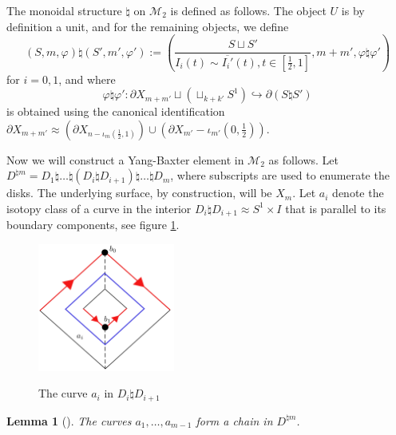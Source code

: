 \documentclass[reqno]{amsart}
\newtheorem{lemma}[theorem]{Lemma}
\theoremstyle{definition}
\theoremstyle{remark}
\begin{document}
The monoidal structure $\natural $ on $\mathcal{M}_2$ is defined
as follows. The object $U$ is by definition a unit,
and for the remaining objects, we define
\[
    \left( S,m, \varphi  \right) \natural
    \left( S',m', \varphi ' \right) 
    :=
    \left( \frac{S \sqcup S'}{I_i(t)
    \sim \overline{I_i'}(t), t \in 
\left[ \frac{1}{2},1 \right] }, m+m',
\varphi \natural \varphi ' \right) 
\] 
for $i = 0,1$, and where
\[
\varphi \natural \varphi ' \colon
\partial X_{m+m'} \sqcup \left( \sqcup_{k+k'}
S^{1}\right) \hookrightarrow \partial
\left( S \natural S' \right) 
\] 
is obtained using the canonical identification
$\partial X_{m+m'} \approx 
\left( \partial X_{n - \iota_m \left( \frac{1}{2},1
\right) } \right) \cup 
\left( \partial X_{m'} - 
\iota_{m'} \left( 0, \frac{1}{2} \right) \right)$.

Now we will construct a Yang-Baxter element
in $\mathcal{M}_2$ as follows. Let
$D^{\natural m} = D_1 \natural \ldots \natural \left( D_i \natural D_{i+1} \right) 
\natural \ldots \natural D_m$, where subscripts are used to enumerate
the disks. The underlying surface, by construction, will
be $X_m$. Let
$a_i$ denote the isotopy class of a curve in the interior
$D_i \natural D_{i+1} \approx
S^{1} \times I$ that is parallel to its
boundary components, see figure \ref{fig:curvem2-png}.

\begin{figure}[H]
    \centering
    \includegraphics[width=0.4\textwidth]{curvem2.png}
    \label{fig:curvem2-png}
    \caption{The curve $a_i$ in $D_i \natural D_{i+1}$}
\end{figure}

\begin{lemma}[]
    The curves $a_1, \ldots, a_{m-1}$ form a chain in
    $D^{\natural m}$.
\end{lemma}
\end{document}
